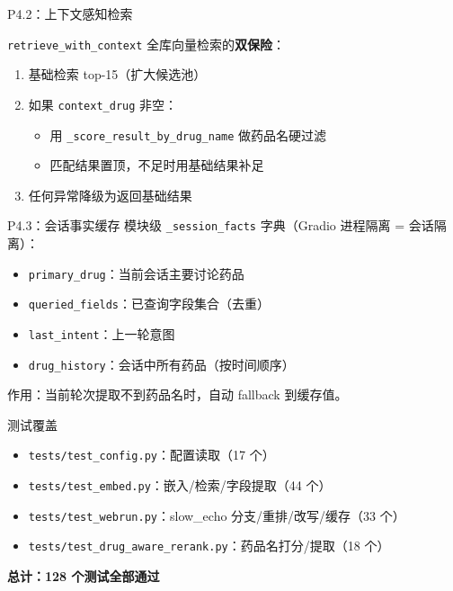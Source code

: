 \documentclass[aspectratio=169,11pt]{beamer}
\begin{document}
\begin{frame}{P4.2：上下文感知检索}
    \begin{block}{\texttt{retrieve\_with\_context}}
        全库向量检索的\textbf{双保险}：
        \begin{enumerate}
            \item 基础检索 top-15（扩大候选池）
            \item 如果 \texttt{context\_drug} 非空：
            \begin{itemize}
                \item 用 \texttt{\_score\_result\_by\_drug\_name} 做药品名硬过滤
                \item 匹配结果置顶，不足时用基础结果补足
            \end{itemize}
            \item 任何异常降级为返回基础结果
        \end{enumerate}
    \end{block}
\end{frame}

\begin{frame}{P4.3：会话事实缓存}
    模块级 \texttt{\_session\_facts} 字典（Gradio 进程隔离 = 会话隔离）：
    \vspace{0.5em}
    \begin{itemize}
        \item \texttt{primary\_drug}：当前会话主要讨论药品
        \item \texttt{queried\_fields}：已查询字段集合（去重）
        \item \texttt{last\_intent}：上一轮意图
        \item \texttt{drug\_history}：会话中所有药品（按时间顺序）
    \end{itemize}
    \vspace{0.5em}
    作用：当前轮次提取不到药品名时，自动 fallback 到缓存值。
\end{frame}

\begin{frame}{测试覆盖}
    \begin{itemize}
        \item \texttt{tests/test\_config.py}：配置读取（17 个）
        \item \texttt{tests/test\_embed.py}：嵌入/检索/字段提取（44 个）
        \item \texttt{tests/test\_webrun.py}：slow\_echo 分支/重排/改写/缓存（33 个）
        \item \texttt{tests/test\_drug\_aware\_rerank.py}：药品名打分/提取（18 个）
    \end{itemize}
    \vspace{0.5em}
    \centering
    \textbf{总计：128 个测试全部通过}
\end{frame}
\end{document}
